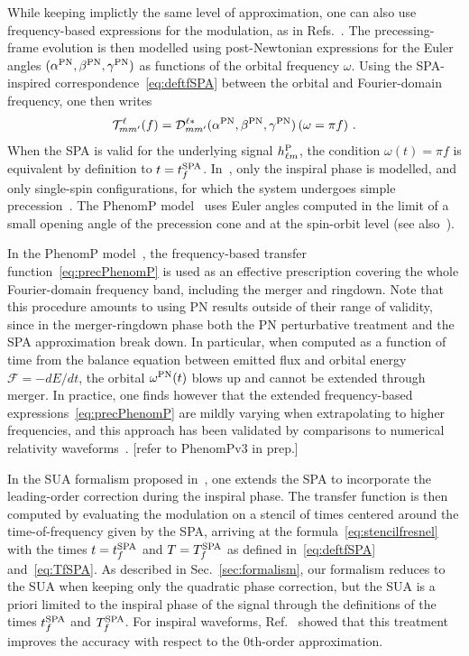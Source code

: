 \documentclass[aps,showpacs,twocolumn,
prd,superscriptaddress,nofootinbib]{revtex4-1}
\newcommand{\be}{\begin{equation}}
\newcommand{\ee}{\end{equation}}
\newcommand\calF{{\mathcal{F}}}
\newcommand\calT{{\mathcal{T}}}
\newcommand\calD{{\mathcal{D}}}
\newcommand{\tfSPA}{t_{f}^{\rm SPA}}
\newcommand{\TfSPA}{T_{f}^{\rm SPA}}
\newcommand{\SM}[1]{{\color{Red} #1}}
\begin{document}
While keeping implictly the same level of approximation, one can also use frequency-based expressions for the modulation, as in Refs.~\cite{LOS13, Hannam+13}. The precessing-frame evolution is then modelled using post-Newtonian expressions for the Euler angles $(\alpha^{\rm PN}, \beta^{\rm PN}, \gamma^{\rm PN})$ as functions of the orbital frequency $\omega$. Using the SPA-inspired correspondence~\eqref{eq:deftfSPA} between the orbital and Fourier-domain frequency, one then writes 
\be\label{eq:precPhenomP}
	\calT^{\ell}_{mm'}(f) = \calD^{\ell *}_{mm'}(\alpha^{\rm PN}, \beta^{\rm PN}, \gamma^{\rm PN}) \left( \omega=\pi f\right) \,.
\ee
When the SPA is valid for the underlying signal $h^{\rm P}_{\ell m}$, the condition $\omega(t) = \pi f$ is equivalent by definition to $t=t^{\rm SPA}_{f}$. In~\cite{LOS13}, only the inspiral phase is modelled, and only single-spin configurations, for which the system undergoes simple precession~\cite{Apostolatos+94, Kidder95}. The PhenomP model~\cite{Hannam+13} uses Euler angles computed in the limit of a small opening angle of the precession cone and at the spin-orbit level (see also~\cite{BBF11, MBBB13}).

In the PhenomP model~\cite{Hannam+13}, the frequency-based transfer function~\eqref{eq:precPhenomP} is used as an effective prescription covering the whole Fourier-domain frequency band, including the merger and ringdown. Note that this procedure amounts to using PN results outside of their range of validity, since in the merger-ringdown phase both the PN perturbative treatment and the SPA approximation break down. In particular, when computed as a function of time from the balance equation between emitted flux and orbital energy $\calF = -dE/dt$, the orbital $\omega^{\rm PN}(t)$ blows up and cannot be extended through merger. In practice, one finds however that the extended frequency-based expressions~\eqref{eq:precPhenomP} are mildly varying when extrapolating to higher frequencies, and this approach has been validated by comparisons to numerical relativity waveforms~\cite{Hannam+13}. \SM{[refer to PhenomPv3 in prep.]}

In the SUA formalism proposed in~\cite{KCY13, KCY14}, one extends the SPA to incorporate the leading-order correction during the inspiral phase. The transfer function is then computed by evaluating the modulation on a stencil of times centered around the time-of-frequency given by the SPA, arriving at the formula~\eqref{eq:stencilfresnel} with the times $t = \tfSPA$ and $T = \TfSPA$ as defined in~\eqref{eq:deftfSPA} and~\eqref{eq:TfSPA}. As described in Sec.~\ref{sec:formalism}, our formalism reduces to the SUA when keeping only the quadratic phase correction, but the SUA is a priori limited to the inspiral phase of the signal through the definitions of the times $t^{\rm SPA}_{f}$ and $T^{\rm SPA}_{f}$. For inspiral waveforms, Ref.~\cite{KCY14} showed that this treatment improves the accuracy with respect to the 0th-order approximation.
\end{document}
